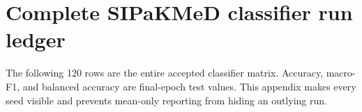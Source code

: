 \chapter{Complete SIPaKMeD classifier run ledger}\label{s1:ch:app01_complete_sipakmed_classifier_run_ledger}

The following 120 rows are the entire accepted classifier matrix. Accuracy, macro-F1, and balanced accuracy are final-epoch test values. This appendix makes every seed visible and prevents mean-only reporting from hiding an outlying run.

\begin{landscape}
\footnotesize
\setlength{\tabcolsep}{3pt}

\end{landscape}
